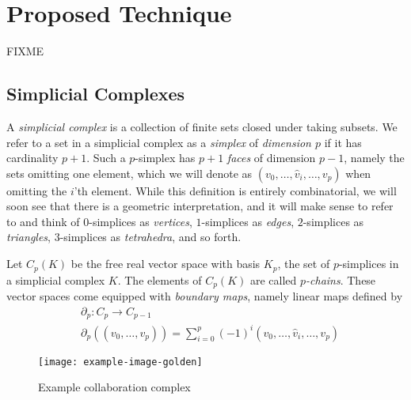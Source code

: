 \section{Proposed Technique}
FIXME

\subsection{Simplicial  Complexes}
A \emph{simplicial complex} is a collection of finite sets closed under taking subsets. We refer to a set in a simplicial complex as a \emph{simplex} of \emph{dimension $p$} if it has cardinality $p+1$. Such a $p$-simplex has $p+1$ \emph{faces} of dimension $p-1$, namely the sets omitting one element, which we will denote as $(v_0,\dotsc,\hat{v}_i,\dotsc, v_p)$ when omitting the $i$'th element. While this definition is entirely combinatorial, we will soon see that there is a geometric interpretation, and it will make sense to refer to and think of $0$-simplices as \emph{vertices}, $1$-simplices as \emph{edges}, $2$-simplices as \emph{triangles}, $3$-simplices as \emph{tetrahedra}, and so forth.

Let $C_p(K)$ be the free real vector space with basis $K_p$, the set of $p$-simplices in a simplicial complex $K$. The elements of $C_p(K)$ are called \emph{$p$-chains}. These vector spaces come equipped with \emph{boundary maps}, namely linear maps defined by
\begin{align*}
  &\partial_p:C_p\to C_{p-1} \\
  &\partial_p((v_0,\dotsc,v_p)) = \sum_{i=0}^p (-1)^i(v_0,\dotsc,\hat{v}_i,\dotsc,v_p)
\end{align*}

\begin{figure}[htbp]
  \centering
  
\texttt{[image: example-image-golden]}
  \caption{Example collaboration complex} \label{fig:cochains}
\end{figure}


